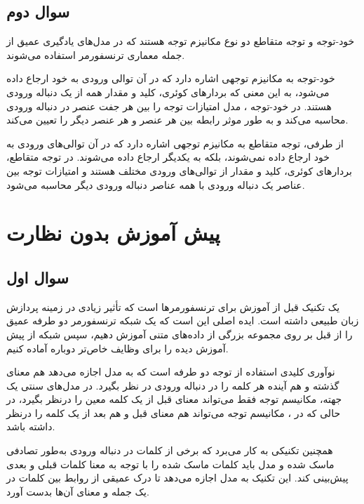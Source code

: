 \documentclass{article}
\begin{document}
\subsection{سوال دوم}
خود-توجه و توجه متقاطع دو نوع مکانیزم توجه هستند که در مدل‌های یادگیری عمیق از جمله معماری ترنسفورمر استفاده می‌شوند.

خود-توجه به مکانیزم توجهی اشاره دارد که در آن توالی ورودی به خود ارجاع داده می‌شود، به این معنی که بردارهای کوئری، کلید و مقدار همه از یک دنباله ورودی هستند. در خود-توجه ، مدل امتیازات توجه را بین هر جفت عنصر در دنباله ورودی محاسبه می‌کند و به طور موثر رابطه بین هر عنصر و هر عنصر دیگر را تعیین می‌کند.

از طرفی، توجه متقاطع به مکانیزم توجهی اشاره دارد که در آن توالی‌های ورودی به خود ارجاع داده نمی‌شوند، بلکه به یکدیگر ارجاع داده می‌شوند. در توجه متقاطع، بردارهای کوئری، کلید و مقدار از توالی‌های ورودی مختلف هستند و امتیازات توجه بین عناصر یک دنباله ورودی با همه عناصر دنباله ورودی دیگر محاسبه می‌شود.


\newpage



\section{پیش آموزش بدون نظارت}

\subsection{سوال اول}

 یک تکنیک قبل از آموزش برای ترنسفورمرها است که تأثیر زیادی در زمینه پردازش زبان طبیعی داشته است. ایده اصلی  این است که یک شبکه ترنسفورمر دو طرفه عمیق را از قبل بر روی مجموعه بزرگی از داده‌های متنی آموزش دهیم، سپس شبکه از پیش آموزش دیده را برای وظایف خاص‌تر  دوباره آماده کنیم.

نوآوری کلیدی  استفاده از توجه دو طرفه است که به مدل اجازه می‌دهد هم معنای گذشته و هم آینده هر کلمه را در دنباله ورودی در نظر بگیرد. در مدل‌های سنتی یک جهته، مکانیسم توجه فقط می‌تواند معنای قبل از یک کلمه معین را درنظر بگیرد، در حالی که در ، مکانیسم توجه می‌تواند هم معنای قبل و هم بعد از یک کلمه را درنظر داشته باشد.

همچنین  تکنیکی به کار می‌برد که برخی از کلمات در دنباله ورودی به‌طور تصادفی ماسک شده و مدل باید کلمات ماسک شده را با توجه به معنا کلمات قبلی و بعدی پیش‌بینی کند. این تکنیک به مدل اجازه می‌دهد تا درک عمیقی از روابط بین کلمات در یک جمله و معنای آن‌ها بدست آورد.
\end{document}
